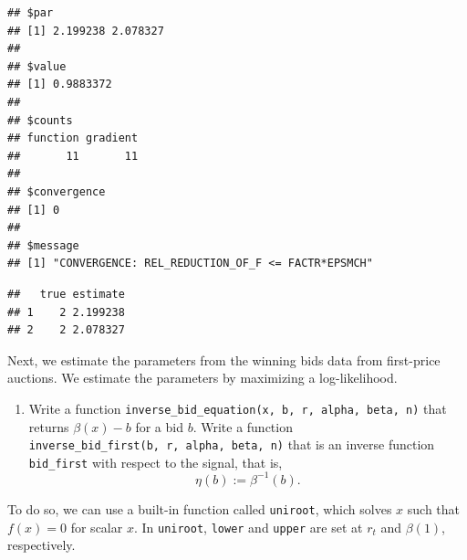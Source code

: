 \documentclass[]{book}
\newenvironment{Shaded}{\begin{snugshade}}{\end{snugshade}}
\newcommand{\KeywordTok}[1]{\textcolor[rgb]{0.13,0.29,0.53}{\textbf{#1}}}
\newcommand{\DataTypeTok}[1]{\textcolor[rgb]{0.13,0.29,0.53}{#1}}
\newcommand{\DecValTok}[1]{\textcolor[rgb]{0.00,0.00,0.81}{#1}}
\newcommand{\FloatTok}[1]{\textcolor[rgb]{0.00,0.00,0.81}{#1}}
\newcommand{\StringTok}[1]{\textcolor[rgb]{0.31,0.60,0.02}{#1}}
\newcommand{\CommentTok}[1]{\textcolor[rgb]{0.56,0.35,0.01}{\textit{#1}}}
\newcommand{\OperatorTok}[1]{\textcolor[rgb]{0.81,0.36,0.00}{\textbf{#1}}}
\newcommand{\NormalTok}[1]{#1}
\providecommand{\tightlist}{%
  \setlength{\itemsep}{0pt}\setlength{\parskip}{0pt}}
\begin{document}
\begin{verbatim}
## $par
## [1] 2.199238 2.078327
## 
## $value
## [1] 0.9883372
## 
## $counts
## function gradient 
##       11       11 
## 
## $convergence
## [1] 0
## 
## $message
## [1] "CONVERGENCE: REL_REDUCTION_OF_F <= FACTR*EPSMCH"
\end{verbatim}

\begin{Shaded}
\end{Shaded}

\begin{verbatim}
##   true estimate
## 1    2 2.199238
## 2    2 2.078327
\end{verbatim}

Next, we estimate the parameters from the winning bids data from
first-price auctions. We estimate the parameters by maximizing a
log-likelihood.

\begin{enumerate}
\def\labelenumi{\arabic{enumi}.}
\setcounter{enumi}{4}
\tightlist
\item
  Write a function
  \texttt{inverse\_bid\_equation(x,\ b,\ r,\ alpha,\ beta,\ n)} that
  returns \(\beta(x) - b\) for a bid \(b\). Write a function
  \texttt{inverse\_bid\_first(b,\ r,\ alpha,\ beta,\ n)} that is an
  inverse function \texttt{bid\_first} with respect to the signal, that
  is, \[
  \eta(b) := \beta^{-1}(b).
  \]
\end{enumerate}

To do so, we can use a built-in function called \texttt{uniroot}, which
solves \(x\) such that \(f(x) = 0\) for scalar \(x\). In
\texttt{uniroot}, \texttt{lower} and \texttt{upper} are set at \(r_t\)
and \(\beta(1)\), respectively.

\begin{Shaded}
\end{Shaded}
\end{document}
